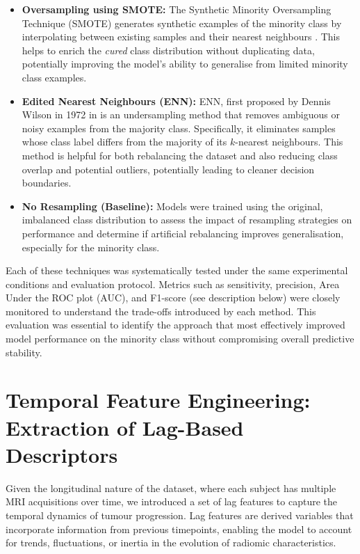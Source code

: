 \documentclass[12pt, a4paper]{report}
\begin{document}
\begin{itemize}
    \item \textbf{Oversampling using SMOTE:} The Synthetic Minority Oversampling Technique (SMOTE) generates synthetic examples of the minority class by interpolating between existing samples and their nearest neighbours \cite{Chawla2002}. This helps to enrich the \textit{cured} class distribution without duplicating data, potentially improving the model’s ability to generalise from limited minority class examples.
    
    \item \textbf{Edited Nearest Neighbours (ENN):} ENN, first proposed by Dennis Wilson in 1972 in \cite{Wilson1972} is an undersampling method that removes ambiguous or noisy examples from the majority class. Specifically, it eliminates samples whose class label differs from the majority of its $k$-nearest neighbours. This method is helpful for both rebalancing the dataset and also reducing class overlap and potential outliers, potentially leading to cleaner decision boundaries.
    
    \item \textbf{No Resampling (Baseline):} Models were trained using the original, imbalanced class distribution to assess the impact of resampling strategies on performance and determine if artificial rebalancing improves generalisation, especially for the minority class.
\end{itemize}

Each of these techniques was systematically tested under the same experimental conditions and evaluation protocol. Metrics such as sensitivity, precision, Area Under the ROC plot (AUC), and F1-score (see description below) were closely monitored to understand the trade-offs introduced by each method. This evaluation was essential to identify the approach that most effectively improved model performance on the minority class without compromising overall predictive stability.

\section{Temporal Feature Engineering: Extraction of Lag-Based Descriptors}

Given the longitudinal nature of the dataset, where each subject has multiple MRI acquisitions over time, we introduced a set of lag features to capture the temporal dynamics of tumour progression. Lag features are derived variables that incorporate information from previous timepoints, enabling the model to account for trends, fluctuations, or inertia in the evolution of radiomic characteristics.
\end{document}
